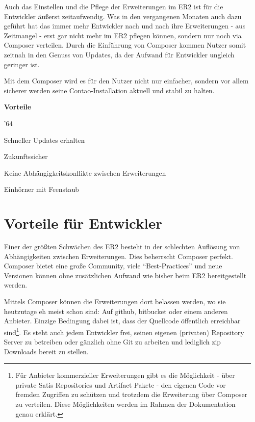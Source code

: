 \documentclass[
paper=a4,
draft=false,%
fontsize=10pt%
]{scrartcl}
\begin{document}
Auch das Einstellen und die Pflege der Erweiterungen im ER2 ist für die Entwickler äußerst zeitaufwendig. Was in den vergangenen Monaten auch dazu geführt hat das immer mehr Entwickler nach und nach ihre Erweiterungen - aus Zeitmangel - erst gar nicht mehr im ER2 pflegen können, sondern nur noch via Composer verteilen. Durch die Einführung von Composer kommen Nutzer somit zeitnah in den Genuss von Updates, da der Aufwand für Entwickler ungleich geringer ist.

Mit dem Composer wird es für den Nutzer nicht nur einfacher, sondern vor allem sicherer werden seine Contao-Installation aktuell und stabil zu halten.

\textbf{Vorteile}
\begin{dinglist}{'64}
\item Schneller Updates erhalten
\item Zukunftssicher
\item Keine Abhängigkeitskonflikte zwischen Erweiterungen
\item Einhörner mit Feenstaub
\end{dinglist}

\newpage

%
%

\newpage

\section{Vorteile für Entwickler}

Einer der größten Schwächen des ER2 besteht in der schlechten Auflösung von Abhängigkeiten zwischen Erweiterungen. Dies beherrscht Composer perfekt. Composer bietet eine große Community, viele “Best-Practices” und neue Versionen können ohne zusätzlichen Aufwand wie bisher beim ER2 bereitgestellt werden.

Mittels Composer können die Erweiterungen dort belassen werden, wo sie heutzutage eh meist schon sind: Auf github, bitbucket oder einem anderen Anbieter. Einzige Bedingung dabei ist, dass der Quellcode öffentlich erreichbar sind\footnote{Für Anbieter kommerzieller Erweiterungen gibt es die Möglichkeit - über private Satis Repositories und Artifact Pakete - den eigenen Code vor fremden Zugriffen zu schützen und trotzdem die Erweiterung über Composer zu verteilen. Diese Möglichkeiten werden im Rahmen der Dokumentation genau erklärt.}.
Es steht auch jedem Entwickler frei, seinen eigenen (privaten) Repository Server zu betreiben oder gänzlich ohne Git zu arbeiten und lediglich zip Downloads bereit zu stellen.
\end{document}
